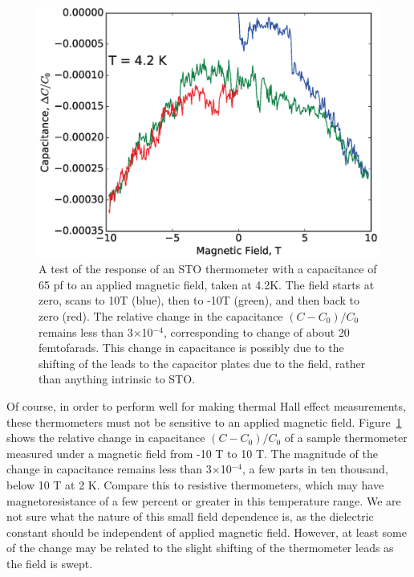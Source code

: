 \documentclass{thesis-umich}
\begin{document}
\begin{figure} \caption[Field response of an STO thermometer]{A test of the response of an STO thermometer with a capacitance of 65 pf to an
    applied magnetic field, taken at 4.2K.  The field starts at zero, scans to
    10T (blue), then to -10T (green), and then back to zero (red).  The relative
    change in the capacitance $(C - C_0)/C_0$ remains less than
  3$\times$10$^{-4}$, corresponding to change of about 20 femtofarads. This
change in capacitance is possibly due to the shifting of the leads to the
capacitor plates due to the field, rather than anything intrinsic to STO.}\label{fig:b_test}
\centering \includegraphics[width=\columnwidth]{figures/cvb_apl.eps}
\end{figure}

Of course, in order to perform well for making thermal Hall effect measurements,
these thermometers must not be sensitive to an applied magnetic field.
Figure~\ref{fig:b_test} shows the relative change in capacitance $(C-C_0)/C_0$ of a
sample thermometer measured under a magnetic field from -10 T to 10 T.  The
magnitude of the change in capacitance remains less than 3$\times$10$^{-4}$, a
few parts in ten thousand, below 10 T at 2 K. Compare this to resistive
thermometers, which may have magnetoresistance of a few percent or greater in
this temperature range\cite{Heine1998,Goodrich1998}. We are not sure what the nature
of this small field dependence is, as the dielectric constant should be
independent of applied magnetic field. However, at least some of the change may
be related to the slight shifting of the thermometer leads as the field is
swept.
\end{document}
